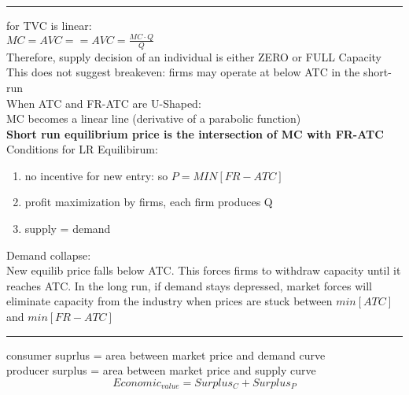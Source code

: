 \documentclass[8pt]{report}
\begin{document}
\hrule

\begin{multicols}{3}

for TVC is linear: \\ $MC = AVC == AVC = \frac{MC \cdot Q}{Q}$ \\
Therefore, supply decision of an individual is either ZERO or FULL Capacity \\
This does not suggest breakeven: firms may operate at below ATC in the short-run \\

When ATC and FR-ATC are U-Shaped: \\
MC becomes a linear line (derivative of a parabolic function) \\
\textbf{Short run equilibrium price is the intersection of MC with FR-ATC} \\

Conditions for LR Equilibirum: \\
\begin{enumerate}
	\item no incentive for new entry: so $P = MIN[FR-ATC]$
	\item profit maximization by firms, each firm produces Q
	\item supply = demand
\end{enumerate}

Demand collapse: \\
New equilib price falls below ATC. This forces firms to withdraw capacity until it reaches ATC. In the long run, if demand stays depressed, market forces will eliminate capacity from the industry when prices are stuck between $min[ATC]$ and $min[FR-ATC]$

\end{multicols}

\hrule

\begin{multicols}{3}

consumer suprlus = area between market price and demand curve \\
producer surplus = area between market price and supply curve \\
$$
	Economic_{value} = Surplus_{C} + Surplus_{P}
$$

\end{multicols}
\end{document}
